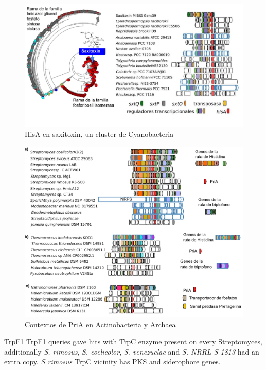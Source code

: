 \documentclass[12pt,twoside]{reedthesis}
\begin{document}
  \begin{figure}[h!tbp]
  \centering
  \includegraphics[angle = 0,scale = 0.7]{chapter4/CORASON/saxitoxin.pdf}
  \caption[HisA en saxitoxin, un cluster de Cyanobacteria ]{\footnotesize{HisA en saxitoxin, un cluster de Cyanobacteria }}
  \label{fig:saxitoxin}
  \end{figure}
  
  \begin{figure}[h!tbp]
  \centering
  \includegraphics[angle = 0,scale = 0.7]{chapter4/CORASON/CORASON.pdf}
  \caption[Contextos de PriA en Actinobacteria y Archaea]{\footnotesize{Contextos de PriA en Actinobacteria y Archaea}}
  \label{fig:PriACORASON}
  \end{figure}
  
  TrpF1 TrpF1 queries gave hits with TrpC enzyme present on every
  Streptomyces, additionally \emph{S. rimosus}, \emph{S. coelicolor},
  \emph{S. venezuelae} and \emph{S. NRRL S-1813} had an extra copy.
  \emph{S rimosus} TrpC vicinity has PKS and siderophore genes.
  
\end{document}
